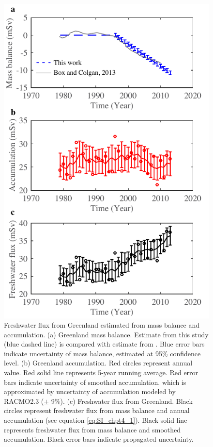 \clearpage
\begin{figure}
	\centering
	\includegraphics{figs_app/FigS3.pdf}
	\caption[Freshwater flux from Greenland estimated from mass balance and accumulation.  (a) Greenland mass balance.]{Freshwater flux from Greenland estimated from mass balance and accumulation.  (a) Greenland mass balance. Estimate from this study (blue dashed line) is compared with estimate from \citet{box2013greenland}. Blue error bars indicate uncertainty of mass balance, estimated at 95\% confidence level. (b) Greenland accumulation.  Red circles represent annual value.  Red solid line represents 5-year running average.  Red error bars indicate uncertainty of smoothed accumulation, which is approximated by uncertainty of accumulation modeled by RACMO2.3 ($\pm$ 9\%).  (c) Freshwater flux from Greenland.  Black circles represent freshwater flux from mass balance and annual accumulation (see equation \ref{eq:SI_chpt4_1}).  Black solid line represents freshwater flux from mass balance and smoothed accumulation.  Black error bars indicate propagated uncertainty.}
	\label{fig:SI4_fig3}
\end{figure}


